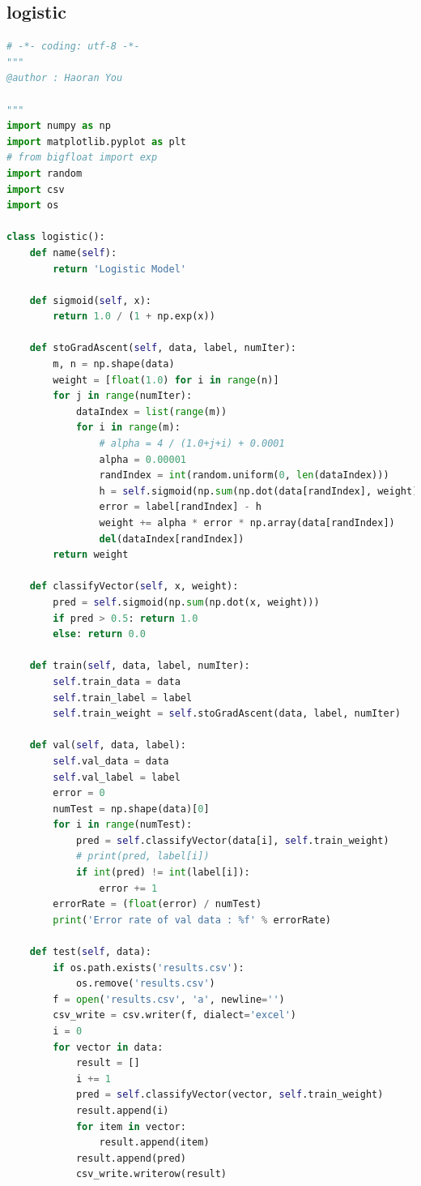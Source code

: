 \documentclass[UTF-8, a4paper, 10pt]{article}
\numberwithin{equation}{section}
\begin{document}
\subsection{logistic}
\begin{lstlisting}[language=python]
# -*- coding: utf-8 -*-
"""
@author : Haoran You

"""
import numpy as np
import matplotlib.pyplot as plt
# from bigfloat import exp
import random
import csv
import os

class logistic():
    def name(self):
        return 'Logistic Model'

    def sigmoid(self, x):
        return 1.0 / (1 + np.exp(x))

    def stoGradAscent(self, data, label, numIter):
        m, n = np.shape(data)
        weight = [float(1.0) for i in range(n)]
        for j in range(numIter):
            dataIndex = list(range(m))
            for i in range(m):
                # alpha = 4 / (1.0+j+i) + 0.0001
                alpha = 0.00001
                randIndex = int(random.uniform(0, len(dataIndex)))
                h = self.sigmoid(np.sum(np.dot(data[randIndex], weight)))
                error = label[randIndex] - h
                weight += alpha * error * np.array(data[randIndex])
                del(dataIndex[randIndex])
        return weight

    def classifyVector(self, x, weight):
        pred = self.sigmoid(np.sum(np.dot(x, weight)))
        if pred > 0.5: return 1.0
        else: return 0.0

    def train(self, data, label, numIter):
        self.train_data = data
        self.train_label = label
        self.train_weight = self.stoGradAscent(data, label, numIter)

    def val(self, data, label):
        self.val_data = data
        self.val_label = label
        error = 0
        numTest = np.shape(data)[0]
        for i in range(numTest):
            pred = self.classifyVector(data[i], self.train_weight)
            # print(pred, label[i])
            if int(pred) != int(label[i]):
                error += 1
        errorRate = (float(error) / numTest)
        print('Error rate of val data : %f' % errorRate)

    def test(self, data):
        if os.path.exists('results.csv'):
            os.remove('results.csv')
        f = open('results.csv', 'a', newline='')
        csv_write = csv.writer(f, dialect='excel')
        i = 0
        for vector in data:
            result = []
            i += 1
            pred = self.classifyVector(vector, self.train_weight)
            result.append(i)
            for item in vector:
                result.append(item)
            result.append(pred)
            csv_write.writerow(result)
\end{lstlisting}
\end{document}
